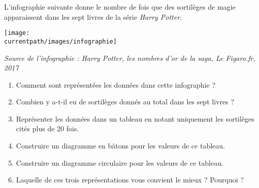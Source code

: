 \begin{exercice*}
   L'infographie suivante donne le nombre de fois que des sortilèges de magie apparaissent dans les sept livres de la série {\it Harry Potter}.
   \begin{center}
      \texttt{[image: \\currentpath/images/infographie]}
   \end{center}
   {\footnotesize\it Source de l'infographie : Harry Potter, les nombres d'or de la saga, Le Figaro.fr, 2017}
   \begin{enumerate}
      \item Comment sont représentées les données dans cette infographie ?
      \item Combien y a-t-il eu de sortilèges donnés au total dans les sept livres ?
      \item Représenter les données dans un tableau en notant uniquement les sortilèges cités plus de 20 fois.
      \item Construire un diagramme en bâtons pour les valeurs de ce tableau.
      \item Construire un diagramme circulaire pour les valeurs de ce tableau.
      \item Laquelle de ces trois représentations vous convient le mieux ? Pourquoi ?
   \end{enumerate}
\end{exercice*}
